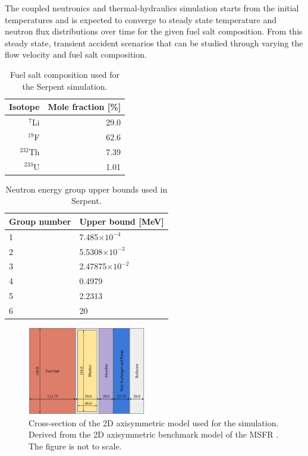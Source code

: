\documentclass{anstrans}
\begin{document}
The coupled neutronics and thermal-hydraulics simulation starts from the initial temperatures and is expected to converge to steady state temperature and neutron flux distributions over time for the given fuel salt composition. From this steady state, transient accident scenarios that can be studied through varying the flow velocity and fuel salt composition.
%
\begin{table}[t]
\centering
\begin{tabular}{rr}
\hline
{Isotope} & {Mole fraction [\%]}\\
\hline
$^7$Li & 29.0\\
$^{19}$F & 62.6\\
$^{232}$Th & 7.39\\
$^{233}$U & 1.01\\
\hline
\end{tabular}
\captionsetup{justification=centering}
\caption{Fuel salt composition used for the Serpent simulation.}
\label{table:fuelsalt}
\end{table}
%
\begin{table}[t]
\centering
\begin{tabular}{ll}
\hline
{Group number} & {Upper bound [MeV]}\\
\hline
1 & 7.485$\times 10^{-4}$\\
2 & 5.5308$\times 10^{-3}$\\
3 & 2.47875$\times 10^{-2}$\\
4 & 0.4979\\
5 & 2.2313\\
6 & 20\\
\hline
\end{tabular}
\captionsetup{justification=centering}
\caption{Neutron energy group upper bounds used in Serpent.}
\label{table:bound}
\end{table}
%
\begin{figure}[h!] 
	\centering
	\includegraphics[width=0.46\textwidth]{./figures/benchmark}
	\captionsetup{justification=centering}
	\caption{Cross-section of the 2D axisymmetric model used for the simulation. Derived from the 2D axisymmetric benchmark model of the MSFR \cite{pettersen_coupled_2016}. The figure is not to scale.}
	\label{fig:benchmark}
\end{figure} 
%
\end{document}
